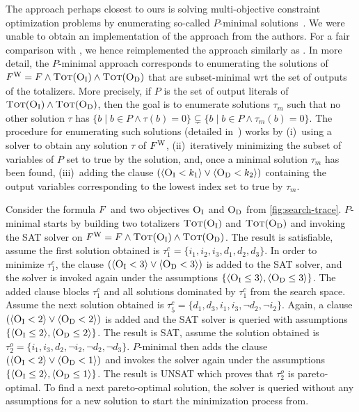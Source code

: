 The approach perhaps closest to ours is solving multi-objective constraint optimization  problems by enumerating so-called
$P$-minimal solutions~\autocite{DBLP:conf/cp/SohBTB17,DBLP:conf/ftp/KoshimuraNFH09}.
We were unable to obtain an implementation of the approach from the authors. For a fair comparison with \algname{}, we hence
reimplemented the approach similarly as \algname{}.
In more detail,
the $P$-minimal approach  corresponds to enumerating the solutions of $F^\text{W} = F \land \textsc{Tot}(\textsc{O}_{\text{I}}) \land \textsc{Tot}(\textsc{O}_{\text{D}})$ that are subset-minimal
wrt the set of outputs of the totalizers.
More precisely, if $P$ is the set of output literals of $\textsc{Tot}(\textsc{O}_{\text{I}}) \land \textsc{Tot}(\textsc{O}_{\text{D}})$, then the goal is to enumerate solutions $\tau_m$ such that
no other solution $\tau$ has $\{ b \mid b \in P \land \tau(b) = 0\} \subsetneq \{ b \mid b \in P \land \tau_m(b) = 0\}$.
The procedure for enumerating such solutions (detailed in~\textcite{DBLP:conf/ftp/KoshimuraNFH09}) works by  (i)~using a solver to obtain any solution $\tau$ of $F^\text{W}$, (ii)~iteratively minimizing the subset of variables of $P$ set to true by the solution, and, once a minimal solution $\tau_m$ has been found, (iii)~adding the clause $(\langle \textsc{O}_{\text{I}} < k_1 \rangle \lor \langle \textsc{O}_{\text{D}} < k_2 \rangle)$ containing the output variables corresponding to the lowest index set to true by $\tau_m$.

\begin{example}
  Consider the formula $F$ and two objectives $\textsc{O}_{\text{I}}$ and $\textsc{O}_{\text{D}}$ from \cref{fig:search-trace}. $P$-minimal starts by building two totalizers 
$\textsc{Tot}(\textsc{O}_{\text{I}})$ and $\textsc{Tot}(\textsc{O}_{\text{D}})$ and invoking the SAT solver on $F^\text{W} = F \land \textsc{Tot}(\textsc{O}_{\text{I}}) \land \textsc{Tot}(\textsc{O}_{\text{D}})$. The result is satisfiable, assume the first solution obtained is 
$\tau^c_1 = \{i_1, i_2, i_3, d_1, d_2, d_3\}$. 
In order to minimize $\tau^c_1$, the clause $(\langle \textsc{O}_{\text{I}} < 3 \rangle \lor \langle \textsc{O}_{\text{D}} < 3 \rangle)$ is added to the SAT solver, and the solver is invoked again under the assumptions $\{ \langle \textsc{O}_{\text{I}} \leq 3 \rangle, \langle \textsc{O}_{\text{D}} \leq 3 \rangle \}$.
The added clause blocks $\tau^c_1$ and all solutions dominated by $\tau^c_1$ from the search space. Assume the next solution obtained is $\tau^c_5 = \{d_1, d_3, i_1, i_3, \lnot d_2, \lnot i_2\}$. 
Again, a clause $(\langle \textsc{O}_{\text{I}} < 2 \rangle \lor \langle \textsc{O}_{\text{D}} < 2 \rangle)$ is added and the SAT solver is queried with assumptions $\{ \langle \textsc{O}_{\text{I}} \leq 2 \rangle, \langle \textsc{O}_{\text{D}} \leq 2 \rangle \}$.
The result is SAT, assume the solution obtained is $\tau^o_2 = \{ i_1, i_3, d_2, \lnot i_2, \lnot d_2, \lnot d_3\}$. 
$P$-minimal then adds the clause $(\langle \textsc{O}_{\text{I}} < 2 \rangle \lor \langle \textsc{O}_{\text{D}} < 1 \rangle)$ and invokes the solver again under the assumptions $\{ \langle \textsc{O}_{\text{I}} \leq 2 \rangle, \langle \textsc{O}_{\text{D}} \leq 1 \rangle \}$.
The result is UNSAT which proves that $\tau^o_2$ is pareto-optimal. 
To find a next pareto-optimal solution, the solver is queried without any assumptions for a new solution to start the minimization process from.
\end{example}

